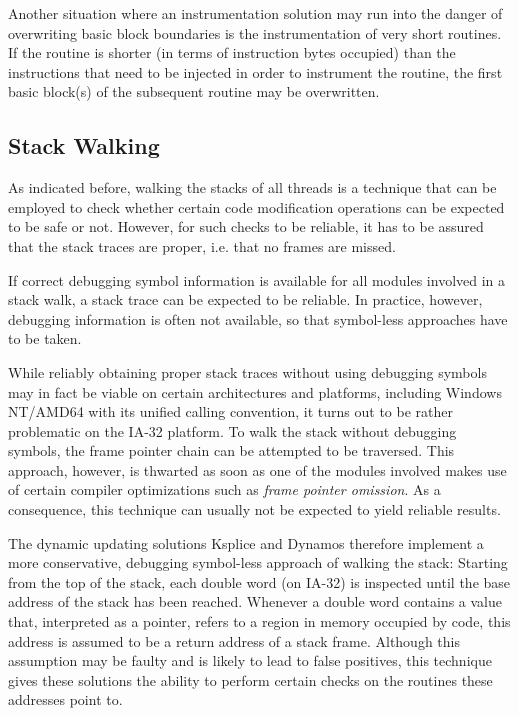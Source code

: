 Another situation where an instrumentation solution may run into the danger of 
overwriting basic block boundaries is the instrumentation of very short routines. 
If the routine is shorter (in terms of instruction bytes occupied) than the
instructions that need to be injected in order to instrument the routine, 
the first basic block(s) of the subsequent routine may be overwritten.


\subsection{Stack Walking}
\label{sec:StackWalking}
As indicated before, walking the stacks of all threads is a technique that can
be employed to check whether certain code modification operations can be expected
to be safe or not. However, for such checks to be reliable, it has to be assured 
that the stack traces are proper, i.e. that no frames are missed.

If correct debugging symbol information is available for all modules involved in a 
stack walk, a stack trace can be expected to be reliable. In practice, however, 
debugging information is often not available, so that symbol-less approaches 
have to be taken.

While reliably obtaining proper stack traces without using debugging symbols may in fact 
be viable on certain architectures and platforms, including Windows NT/AMD64 with its unified calling 
convention, it turns out to be rather problematic on the IA-32 platform. To walk the
stack without debugging symbols, the frame pointer chain can be attempted to be 
traversed. This approach, however, is thwarted as soon as one
of the modules involved makes use of certain compiler optimizations such as 
\emph{frame pointer omission}. As a consequence, this technique can usually
not be expected to yield reliable results.

The dynamic updating solutions Ksplice \cite{Ksplice08} 
and Dynamos therefore implement a more conservative, debugging symbol-less approach of
walking the stack: Starting from the top of the stack, each double word
(on IA-32) is inspected until the base address of the stack has been reached. 
Whenever a double word contains a value that, interpreted as a pointer, refers
to a region in memory occupied by code, this address is assumed to be
a return address of a stack frame. Although this 
assumption may be faulty and is likely to lead to false positives, 
this technique gives these solutions the ability to perform certain 
checks on the routines these addresses point to. 

